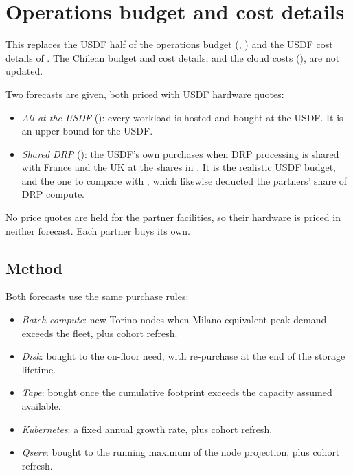 \section{Operations budget and cost details}\label{sec:upbudget}

This replaces the USDF half of the operations budget (,
) and the USDF cost details of .
The Chilean budget and cost details, and the cloud costs (),
are not updated.

Two forecasts are given, both priced with USDF hardware quotes:
\begin{itemize}
\item \emph{All at the USDF} (): every workload is hosted
      and bought at the USDF. It is an upper bound for the USDF.
\item \emph{Shared DRP} (): the USDF's own purchases
      when DRP processing is shared with France and the UK at the shares in
      . It is the realistic USDF budget, and the one to
      compare with , which likewise deducted the
      partners' share of DRP compute.
\end{itemize}
No price quotes are held for the partner facilities, so their hardware is
priced in neither forecast. Each partner buys its own.

\subsection{Method}

Both forecasts use the same purchase rules:

\begin{itemize}
\item \emph{Batch compute}: new Torino nodes when Milano-equivalent peak
      demand exceeds the fleet, plus cohort refresh.
\item \emph{Disk}: bought to the on-floor need, with re-purchase at the end
      of the storage lifetime.
\item \emph{Tape}: bought once the cumulative footprint exceeds the capacity
      assumed available.
\item \emph{Kubernetes}: a fixed annual growth rate, plus cohort refresh.
\item \emph{Qserv}: bought to the running maximum of the node projection,
      plus cohort refresh.
\end{itemize}

